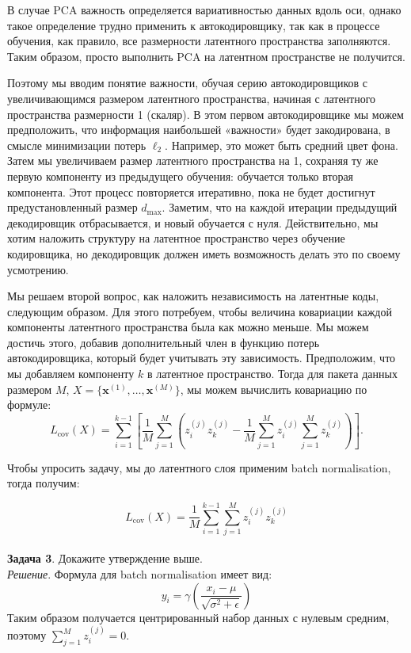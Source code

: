 В случае PCA важность определяется вариативностью данных вдоль оси, однако такое определение трудно применить к автокодировщику, так как в процессе обучения, как правило, все размерности латентного пространства заполняются. Таким образом, просто выполнить PCA на латентном пространстве не получится.

Поэтому мы вводим понятие важности, обучая серию автокодировщиков с увеличивающимся размером латентного пространства, начиная с латентного пространства размерности 1 (скаляр). В этом первом автокодировщике мы можем предположить, что информация наибольшей «важности» будет закодирована, в смысле минимизации потерь \( \ell_2 \). Например, это может быть средний цвет фона. Затем мы увеличиваем размер латентного пространства на 1, сохраняя ту же первую компоненту из предыдущего обучения: обучается только вторая компонента. Этот процесс повторяется итеративно, пока не будет достигнут предустановленный размер \( d_{\max} \). Заметим, что на каждой итерации предыдущий декодировщик отбрасывается, и новый обучается с нуля. Действительно, мы хотим наложить структуру на латентное пространство через обучение кодировщика, но декодировщик должен иметь возможность делать это по своему усмотрению.

Мы решаем второй вопрос, как наложить независимость на латентные коды, следующим образом. Для этого потребуем, чтобы величина ковариации каждой компоненты латентного пространства была как можно меньше. Мы можем достичь этого, добавив дополнительный член в функцию потерь автокодировщика, который будет учитывать эту зависимость. Предположим, что мы добавляем компоненту \( k \) в латентное пространство. Тогда для пакета данных размером \( M \), \( X = \{ \mathbf{x}^{(1)}, \dots, \mathbf{x}^{(M)} \} \), мы можем вычислить ковариацию по формуле:
\[
    L_{\text{cov}}(X) = \sum_{i=1}^{k-1} \left[ \frac{1}{M} \sum_{j=1}^{M} \left( z_i^{(j)} z_k^{(j)} - \frac{1}{M} \sum_{j=1}^{M} z_i^{(j)} \sum_{j=1}^{M} z_k^{(j)} \right) \right].
\]

Чтобы упросить задачу, мы до латентного слоя применим batch normalisation, тогда получим:

$$L_{\text{cov}}(X) = \frac{1}{M} \sum_{i=1}^{k-1} \sum_{j=1}^{M} z_i^{(j)} z_k^{(j)}
$$\\

\textbf{Задача 3}. Докажите утверждение выше.\\

\textit{Решение}.
Формула для batch normalisation имеет вид:
\[
    y_i = \gamma \left( \frac{x_i - \mu}{\sqrt{\sigma^2 + \epsilon}} \right)
\]
Таким образом получается центрированный набор данных с нулевым средним, поэтому  $\sum_{j=1}^{M} z_i^{(j)} = 0$.\\

